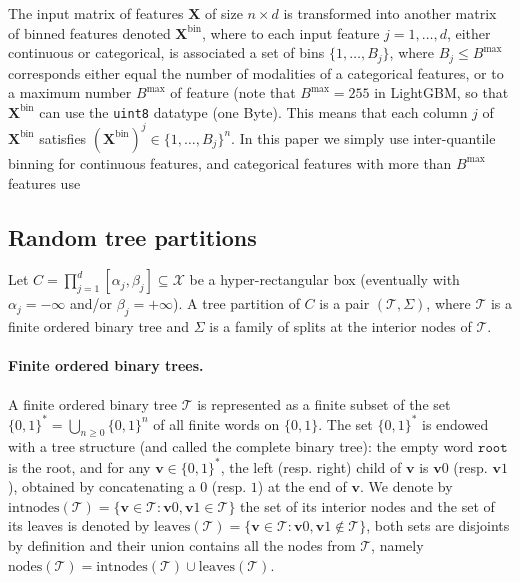 \documentclass{article}
\renewcommand{\leq}{\leqslant}
\renewcommand{\geq}{\geqslant}
\newcommand{\bs}{\boldsymbol}
\newcommand{\cX}{\mathcal X}
\newcommand{\splits}{\Sigma} %
\newcommand{\node}{\mathbf{v}} %
\newcommand{\nodes}{\mathrm{nodes}} %
\newcommand{\inodes}{\mathrm{intnodes}} %
\newcommand{\leaves}{\mathrm{leaves}} %
\renewcommand{\root}{\mathtt{root}} %
\newcommand{\tree}{\mathcal{T}} %
\begin{document}
The input matrix of features $\bs X$ of size $n \times d$ is transformed into another matrix of binned features denoted $\bs X^{\text{bin}}$, where to each input feature $j =1, \ldots, d$, either continuous or categorical, is associated a set of bins $\{ 1, \ldots, B_j \}$, where $B_j \leq B^{\max} $ corresponds either equal the number of modalities of a categorical features, or to a maximum number $B^{\max}$ of feature (note that $B^{\max} = 255$ in LightGBM, so that $\bs X^{\text{bin}}$ can use the \texttt{uint8} datatype (one Byte).
This means that each column $j$ of $\bs X^\text{bin}$ satisfies $(\bs X^\text{bin})^j \in \{ 1, \ldots, B_j \}^n$.
In this paper we simply use inter-quantile binning for continuous features, and categorical features with more than $B^{\max}$ features use 

\subsection{Random tree partitions}
\label{subsec:tree}

Let $C = \prod_{j=1}^d [\alpha_j, \beta_j] \subseteq \cX$ be a hyper-rectangular box (eventually with $\alpha_j = -\infty$ and/or $\beta_j = +\infty$).
A tree partition of $C$ is a pair $(\tree, \splits)$, where $\tree$ is a finite ordered binary tree and $\splits$ is a family of splits at the interior nodes of $\tree$.

\paragraph{Finite ordered binary trees.} 

A finite ordered binary tree $\tree$ is represented as a finite subset of the set $\{ 0, 1 \}^* = \bigcup_{n \geq 0} \{ 0, 1 \}^n$ of all finite words on $\{ 0, 1\}$.
The set $\{ 0, 1\}^*$ is endowed with a tree structure (and called the complete binary tree): the empty word $\root$ is the root, and for any $\node \in \{ 0, 1\}^*$, the left (resp. right) child of $\node$ is $\node 0$ (resp. $\node 1$), obtained by concatenating a $0$ (resp. $1$) at the end of $\node$.
We denote by $\inodes (\tree) = \{ \node \in \tree : \node 0, \node 1 \in \tree \}$ the set of its interior nodes and the set of its leaves is denoted by $\leaves (\tree) = \{ \node \in \tree : \node 0, \node 1 \not\in \tree \}$, both sets are disjoints by definition and their union contains all the nodes from $\tree$, namely $\nodes(\tree) = \inodes (\tree) \cup \leaves (\tree)$.
\end{document}
